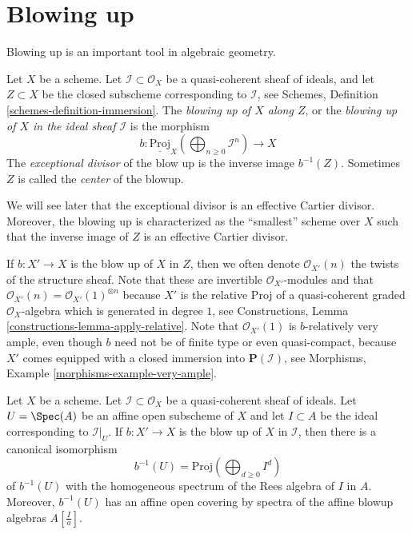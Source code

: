\section{Blowing up}
\label{section-blowing-up}

\noindent
Blowing up is an important tool in algebraic geometry.

\begin{definition}
\label{definition-blow-up}
Let $X$ be a scheme. Let $\mathcal{I} \subset \mathcal{O}_X$ be a
quasi-coherent sheaf of ideals, and let $Z \subset X$ be the closed subscheme
corresponding to $\mathcal{I}$, see
Schemes, Definition \ref{schemes-definition-immersion}.
The {\it blowing up of $X$ along $Z$}, or the
{\it blowing up of $X$ in the ideal sheaf $\mathcal{I}$} is
the morphism
$$
b :
\underline{\text{Proj}}_X
\left(\bigoplus\nolimits_{n \geq 0} \mathcal{I}^n\right)
\longrightarrow
X
$$
The {\it exceptional divisor} of the blow up is the inverse image
$b^{-1}(Z)$. Sometimes $Z$ is called the {\it center} of the blowup.
\end{definition}

\noindent
We will see later that the exceptional divisor is an effective Cartier
divisor. Moreover, the blowing up is characterized as the ``smallest'' scheme
over $X$ such that the inverse image of $Z$ is an effective Cartier divisor.

\medskip\noindent
If $b : X' \to X$ is the blow up of $X$ in $Z$, then we often denote
$\mathcal{O}_{X'}(n)$ the twists of the structure sheaf. Note that these
are invertible $\mathcal{O}_{X'}$-modules and that
$\mathcal{O}_{X'}(n) = \mathcal{O}_{X'}(1)^{\otimes n}$
because $X'$ is the relative Proj of a quasi-coherent graded
$\mathcal{O}_X$-algebra which is generated in degree $1$, see
Constructions, Lemma \ref{constructions-lemma-apply-relative}.
Note that $\mathcal{O}_{X'}(1)$ is $b$-relatively very ample, even though
$b$ need not be of finite type or even quasi-compact, because
$X'$ comes equipped with a closed immersion into $\mathbf{P}(\mathcal{I})$,
see Morphisms, Example \ref{morphisms-example-very-ample}.

\begin{lemma}
\label{lemma-blowing-up-affine}
Let $X$ be a scheme. Let $\mathcal{I} \subset \mathcal{O}_X$ be a
quasi-coherent sheaf of ideals. Let $U = \Spec(A)$ be an affine open
subscheme of $X$ and let $I \subset A$ be the ideal corresponding to
$\mathcal{I}|_U$. If $b : X' \to X$ is the blow up of $X$ in $\mathcal{I}$,
then there is a canonical isomorphism
$$
b^{-1}(U) = \text{Proj}(\bigoplus\nolimits_{d \geq 0} I^d)
$$
of $b^{-1}(U)$ with the homogeneous spectrum of the Rees algebra
of $I$ in $A$. Moreover, $b^{-1}(U)$ has an affine open covering by
spectra of the affine blowup algebras $A[\frac{I}{a}]$.
\end{lemma}


